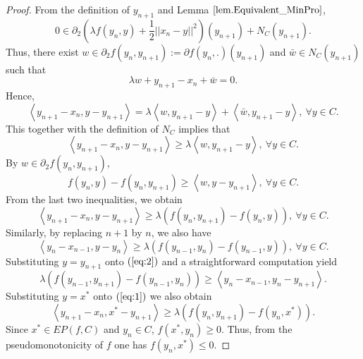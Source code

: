 \documentclass{aims}
\theoremstyle{definition}
\begin{document}
\begin{proof}
From the definition of $y_{n+1}$ and Lemma $\ref{lem.Equivalent_MinPro}$,
\begin{equation*}
0\in \partial_2\left(\lambda f(y_n,y)+\frac{1}{2}||x_n-y||^2\right)(y_{n+1})+N_C(y_{n+1}).
\end{equation*}
Thus, there exist $w\in \partial_2 f(y_n,y_{n+1}):=\partial f(y_n,.)(y_{n+1})$ and $\bar{w}\in N_C(y_{n+1})$ such that
\begin{equation*}
\lambda w+y_{n+1}-x_n+\bar{w}=0.
\end{equation*}
Hence,
\begin{equation*}
\left\langle y_{n+1}-x_n,y-y_{n+1}\right\rangle=\lambda \left\langle w,y_{n+1}-y\right\rangle+\left\langle \bar{w},y_{n+1}-y\right\rangle,~\forall y\in C.
\end{equation*}
This together with the definition of $N_C$ implies that
\begin{equation*}
\left\langle y_{n+1}-x_n,y-y_{n+1}\right\rangle\ge\lambda \left\langle w,y_{n+1}-y\right\rangle,~\forall y\in C.
\end{equation*}
By $w\in \partial_2 f(y_n,y_{n+1})$,
\begin{equation*}
f(y_n,y)-f(y_n,y_{n+1})\ge \left\langle w,y-y_{n+1}\right\rangle,~\forall y\in C.
\end{equation*}
From the last two inequalities, we obtain
\begin{equation}\label{eq:1}
\left\langle y_{n+1}-x_n,y-y_{n+1}\right\rangle\ge \lambda\left(f(y_n,y_{n+1})-f(y_n,y)\right),~\forall y\in C.
\end{equation}
Similarly, by replacing $n+1$ by $n$, we also have
\begin{equation}\label{eq:2}
\left\langle y_{n}-x_{n-1},y-y_{n}\right\rangle\ge \lambda\left(f(y_{n-1},y_{n})-f(y_{n-1},y)\right),~\forall y\in C.
\end{equation}
Substituting $y=y_{n+1}$ onto $(\ref{eq:2})$ and a straightforward computation yield
\begin{equation}\label{eq:3}
\lambda\left(f(y_{n-1},y_{n+1})-f(y_{n-1},y_{n})\right)\ge\left\langle y_{n}-x_{n-1},y_{n}-y_{n+1}\right\rangle .
\end{equation}
Substituting $y=x^*$ onto $(\ref{eq:1})$ we also obtain
\begin{equation}\label{eq:3*}
\left\langle y_{n+1}-x_n,x^*-y_{n+1}\right\rangle\ge \lambda\left(f(y_n,y_{n+1})-f(y_n,x^*)\right).
\end{equation}
Since $x^*\in EP(f,C)$ and $y_n\in C$, $f(x^*,y_n)\ge 0$. Thus, from the pseudomonotonicity of $f$ one has $f(y_n,x^*)\le 0$. 

\end{proof}
\end{document}
